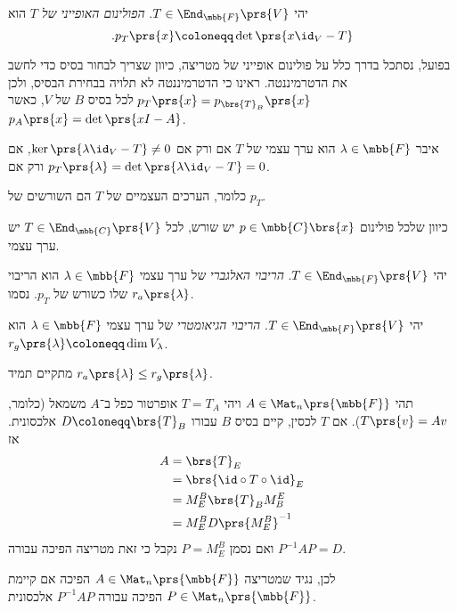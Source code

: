 \documentclass[a4paper,10pt,twoside,openany]{book}
\begin{document}
\begin{definition}
יהי
$T \in \End_{\mbb{F}}\prs{V}$.
\emph{הפולינום האופייני של
$T$}
הוא
\[\text{.} p_T\prs{x} \coloneqq \det\prs{x \id_V - T}\]
\end{definition}

\begin{remark}
בפועל, נסתכל בדרך כלל על פולינום אופייני של מטריצה, כיוון שצריך לבחור בסיס כדי לחשב את הדטרמיננטה.
ראינו כי הדטרמיננטה לא תלויה בבחירת הבסיס, ולכן
$p_T\prs{x} = p_{\brs{T}_B}\prs{x}$
לכל בסיס
$B$
של
$V$,
כאשר
$p_A\prs{x} = \det\prs{xI - A}$.
\end{remark}

\begin{corollary}
איבר
$\lambda \in \mbb{F}$
הוא ערך עצמי של
$T$
אם ורק אם
$\ker\prs{\lambda \id_V - T} \neq 0$,
אם ורק אם
$p_T\prs{\lambda} = \det\prs{\lambda \id_V - T} = 0$.

כלומר, הערכים העצמיים של
$T$
הם השורשים של
$p_T$.
\end{corollary}

\begin{remark}
כיוון שלכל פולינום
$p \in \mbb{C}\brs{x}$
יש שורש, לכל
$T \in \End_{\mbb{C}}\prs{V}$
יש ערך עצמי.
\end{remark}

\begin{definition}
יהי
$T \in \End_{\mbb{F}}\prs{V}$.
\emph{הריבוי האלגברי}
של ערך עצמי
$\lambda \in \mbb{F}$
הוא הריבוי שלו כשורש של
$p_T$.
נסמו
$r_a\prs{\lambda}$.
\end{definition}

\begin{definition}
יהי
$T \in \End_{\mbb{F}}\prs{V}$.
\emph{הריבוי הגיאומטרי}
של ערך עצמי
$\lambda \in \mbb{F}$
הוא
$r_g\prs{\lambda} \coloneqq \dim V_\lambda$.
\end{definition}

\begin{remark}
מתקיים תמיד
$r_a\prs{\lambda} \leq r_g\prs{\lambda}$.
\end{remark}

\begin{definition}
תהי
$A \in \Mat_{n}\prs{\mbb{F}}$
ויהי
$T = T_A$
אופרטור כפל ב־$
A$
משמאל (כלומר,
$T\prs{v} = Av$).
אם
$T$
לכסין, קיים בסיס
$B$
עבורו
$D \coloneqq \brs{T}_B$
אלכסונית.
אז
\begin{align*}
A &= \brs{T}_E
\\&= \brs{\id \circ T \circ \id}_E
\\&= M^B_E \brs{T}_B M^E_B
\\&= M^B_E D \prs{M^B_E}^{-1}
\end{align*}
ואם נסמן
$P = M^B_E$
נקבל כי זאת מטריצה הפיכה עבורה
$P^{-1} A P = D$.

לכן, נגיד שמטריצה
$A \in \Mat_n\prs{\mbb{F}}$
הפיכה אם קיימת
$P \in \Mat_n\prs{\mbb{F}}$
הפיכה עבורה
$P^{-1} A P$
אלכסונית.
\end{definition}
\end{document}
